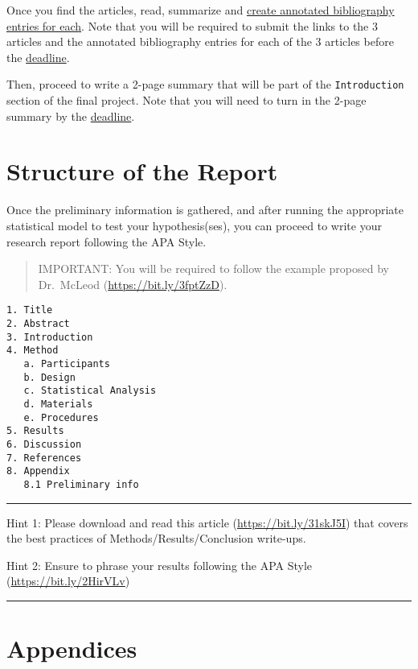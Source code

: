 \documentclass[
]{article}
\begin{document}
Once you find the articles, read, summarize and \href{https://bit.ly/2YIGK2t}{create annotated bibliography entries for each}. Note that you will be required to submit the links to the 3 articles and the annotated bibliography entries for each of the 3 articles before the \protect\hyperlink{deadlines}{deadline}.

Then, proceed to write a 2-page summary that will be part of the \texttt{Introduction} section of the final project. Note that you will need to turn in the 2-page summary by the \protect\hyperlink{deadlines}{deadline}.

\hypertarget{structure-of-the-report}{%
\section{Structure of the Report}\label{structure-of-the-report}}

Once the preliminary information is gathered, and after running the appropriate statistical model to test your hypothesis(ses), you can proceed to write your research report following the APA Style.

\begin{quote}
IMPORTANT: You will be required to follow the example proposed by Dr.~McLeod (\url{https://bit.ly/3fptZzD}).
\end{quote}

\begin{verbatim}
1. Title
2. Abstract
3. Introduction
4. Method
   a. Participants
   b. Design
   c. Statistical Analysis
   d. Materials
   e. Procedures
5. Results
6. Discussion
7. References
8. Appendix
   8.1 Preliminary info
\end{verbatim}

\begin{center}\rule{0.5\linewidth}{0.5pt}\end{center}

Hint 1: Please download and read this article (\url{https://bit.ly/31skJ5I}) that covers the best practices of Methods/Results/Conclusion write-ups.

Hint 2: Ensure to phrase your results following the APA Style (\url{https://bit.ly/2HirVLv})

\begin{center}\rule{0.5\linewidth}{0.5pt}\end{center}

\hypertarget{appendices}{%
\section{Appendices}\label{appendices}}
\end{document}
